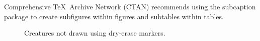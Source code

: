 Comprehensive \TeX\ Archive Network (CTAN) recommends using the subcaption package to create subfigures within figures and subtables within tables.

    \begin{figure}[!hbtp]
	\centering
	\caption{Creatures not drawn using dry-erase markers.}
	\label{fig:creatures}
    \end{figure}

